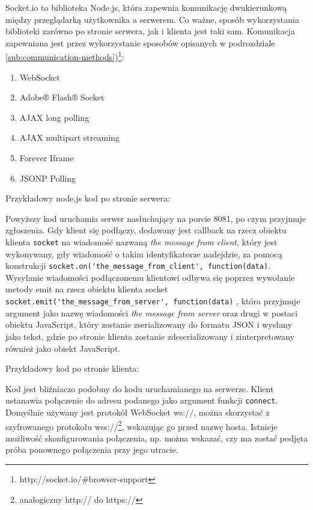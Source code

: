 Socket.io to biblioteka Node.js, która zapewnia komunikację dwukierunkową między przeglądarką użytkownika a serwerem. Co ważne, sposób wykorzystania biblioteki zarówno po stronie serwera, jak i klienta jest taki sam. Komunikacja zapewniana jest przez wykorzystanie sposobów opisanych w podrozdziale \ref{sub:communication-methods})\footnote{http://socket.io/\#browser-support}:

\begin{enumerate}
  \item WebSocket
  \item Adobe® Flash® Socket
  \item AJAX long polling
  \item AJAX multipart streaming
  \item Forever Iframe
  \item JSONP Polling
\end{enumerate}

Przykładowy node.js kod po stronie serwera:



Powyższy kod uruchamia serwer nasłuchujący na porcie 8081, po czym przyjmuje zgłoszenia. Gdy klient się podłączy, dodawany jest callback na rzecz obiektu klienta \lstinline{socket} na wiadomość nazwaną \emph{the message from client}, który jest wykonywany, gdy wiadomość o takim identyfikatorze nadejdzie, za pomocą konstrukcji \lstinline{socket.on('the_message_from_client', function(data)}. Wysyłanie wiadomości podłączonemu klientowi odbywa się poprzez wywołanie metody emit na rzecz obiektu klienta socket \lstinline{socket.emit('the_message_from_server', function(data)} , która przyjmuje argument jako nazwę wiadomości \emph{the message from server} oraz drugi w postaci obiektu JavaScript, który zostanie zserializowany do formatu JSON i wysłany jako tekst, gdzie po stronie klienta zostanie zdeserializowany i zinterpretowany również jako obiekt JavaScript.

Przykładowy kod po stronie klienta:



Kod jest bliźniaczo podobny do kodu uruchamianego na serwerze. Klient ustanawia połączenie do adresu podanego jako argument funkcji \lstinline{connect}. Domyślnie używany jest protokół WebSocket ws://, można skorzystać z szyfrowanego protokołu wss://\footnote{analogiczny http:// do https://}, wskazując go przed nazwę hosta. Istnieje możliwość skonfigurowania połączenia, np. można wskazać, czy ma zostać podjęta próba ponownego połączenia przy jego utracie.

